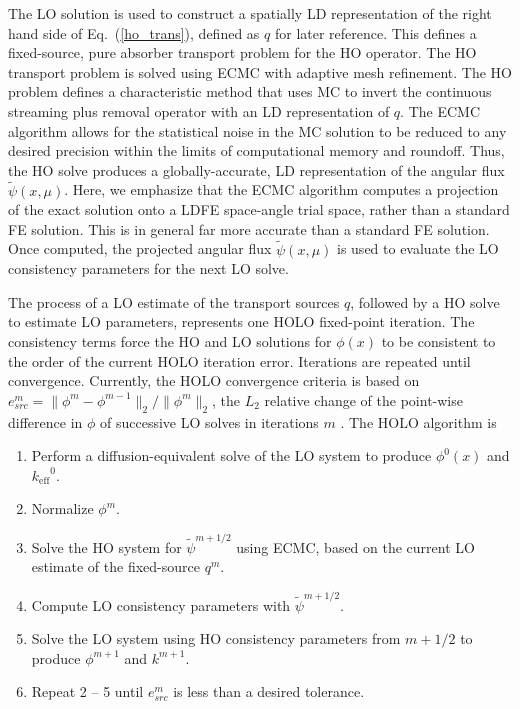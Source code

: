 \documentclass[10pt,twocolumn,pdftex,superscriptaddress]{anstrans}
\renewcommand{\eqref}[1]{(\ref{#1})}
\newcommand{\keff}{\ensuremath{k_{\text{eff}}}}
\begin{document}
The LO solution is used to construct a spatially LD representation of the right
hand side of Eq.~\eqref{ho_trans}, defined as  $q$ for later reference.  This defines a fixed-source, pure absorber
transport problem for the HO operator.  The HO transport problem is solved using ECMC with adaptive mesh
refinement.  The HO problem defines a characteristic method that uses MC to
invert the continuous streaming plus removal operator with an LD representation of $q$.  The ECMC algorithm allows for the statistical noise in the MC
solution to be reduced to any desired precision within the limits of computational memory and
roundoff.  Thus, the HO solve produces a
globally-accurate, LD representation of the angular flux
$\tilde{\psi}(x,\mu)$.  Here, we emphasize that the ECMC algorithm computes a
projection of the exact solution onto a LDFE space-angle trial space, rather than a
standard FE solution.  This is in general far
more accurate than a standard FE solution.  Once computed, the projected
angular flux $\tilde{\psi}(x,\mu)$ is used to evaluate the LO
consistency parameters for the next LO solve.  

The process of a LO estimate of the transport sources $q$, followed by a HO
solve to estimate LO parameters, represents one HOLO fixed-point iteration.
The consistency terms force the HO
and LO solutions for $\phi(x)$ to be consistent to the order of the current HOLO
iteration error.  Iterations are repeated until convergence.  Currently, the HOLO convergence criteria is based on
$e_{src}^{m} = \|\phi^{m} -
\phi^{m-1}\|_2/\|\phi^{m} \|_2$, the $L_2$ relative change of the point-wise
difference in $\phi$ of successive LO solves in iterations $m$ .
The HOLO algorithm is
\begin{enumerate}
\item Perform a diffusion-equivalent solve of the LO system to
  produce $\phi^{0}(x)$ and $\keff^0$.
\item Normalize $\phi^{m}$.
\item Solve the HO system for $\tilde\psi^{m+1/2}$ using ECMC, based on the current
    LO estimate of the fixed-source $q^m$.
\item Compute LO consistency parameters with $\tilde{\psi}^{m+1/2}$.  
\item Solve the LO system using HO consistency parameters from $m+1/2$ to produce
    $\phi^{m+1}$ and $k^{m+1}$.
\item Repeat 2 -- 5 until $e_{src}^{m}$ is less than a desired tolerance.
\end{enumerate}
\end{document}

